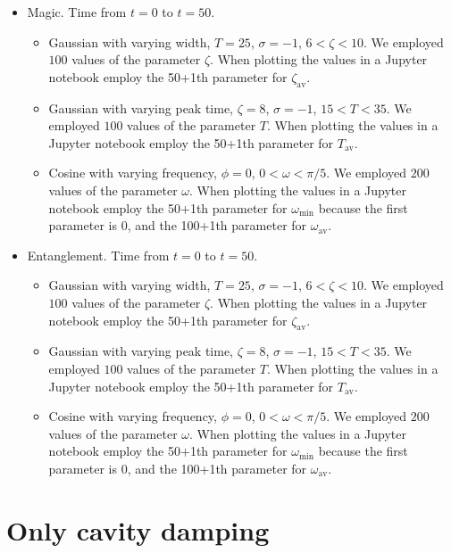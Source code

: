 \documentclass{article}
\begin{document}
\begin{itemize}
\begin{itemize}
    \end{itemize}
    \item Magic. Time from $t=0$ to $t=50$.
    \begin{itemize}
         \item Gaussian with varying width, $T=25$, $\sigma=-1$, $6<\zeta<10$. We employed $100$ values of the parameter $\zeta$.
        When plotting the values in a Jupyter notebook employ the 50+1th parameter for $\zeta_{\text{av}}$.
        \item Gaussian with varying peak time, $\zeta=8$, $\sigma=-1$, $15<T<35$. We employed $100$ values of the parameter $T$.
        When plotting the values in a Jupyter notebook employ the 50+1th parameter for $T_{\text{av}}$.
        \item Cosine with varying frequency, $\phi=0$, $0<\omega<\pi/5$. We employed $200$ values of the parameter $\omega$.
        When plotting the values in a Jupyter notebook employ the 50+1th parameter for $\omega_{\text{min}}$ because the first parameter is $0$, and the 100+1th parameter for $\omega_{\text{av}}$.
    \end{itemize}
    \item Entanglement. Time from $t=0$ to $t=50$.
    \begin{itemize}
        \item Gaussian with varying width, $T=25$, $\sigma=-1$, $6<\zeta<10$. We employed $100$ values of the parameter $\zeta$.
        When plotting the values in a Jupyter notebook employ the 50+1th parameter for $\zeta_{\text{av}}$.
        \item Gaussian with varying peak time, $\zeta=8$, $\sigma=-1$, $15<T<35$. We employed $100$ values of the parameter $T$.
        When plotting the values in a Jupyter notebook employ the 50+1th parameter for $T_{\text{av}}$.
        \item Cosine with varying frequency, $\phi=0$, $0<\omega<\pi/5$. We employed $200$ values of the parameter $\omega$.
        When plotting the values in a Jupyter notebook employ the 50+1th parameter for $\omega_{\text{min}}$ because the first parameter is $0$, and the 100+1th parameter for $\omega_{\text{av}}$.
    \end{itemize}
\end{itemize}

\section{Only cavity damping}
\end{document}

